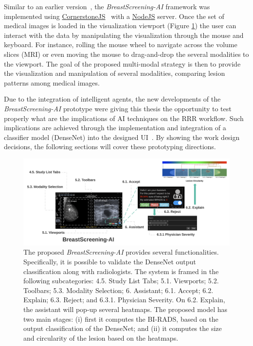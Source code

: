 Similar to an earlier version~\cite{https://doi.org/10.13140/rg.2.2.29816.70409}, the {\it BreastScreening-AI} framework was implemented using \href{https://cornerstonejs.org/}{CornerstoneJS}~\cite{urban2017lesiontracker} with a \href{https://nodejs.org/}{NodeJS} server.
Once the set of medical images is loaded in the visualization viewport (Figure \ref{fig:fig040}) the user can interact with the data by manipulating the visualization through the mouse and keyboard.
For instance, rolling the mouse wheel to navigate across the volume slices (\ac{MRI}) or even moving the mouse to drag-and-drop the several modalities to the viewport.
The goal of the proposed multi-modal strategy is then to provide the visualization and manipulation of several modalities, comparing lesion patterns among medical images.

Due to the integration of intelligent agents, the new developments of the {\it BreastScreening-AI} prototype were giving this thesis the opportunity to test properly what are the implications of \ac{AI} techniques on the \ac{RRR} workflow.
Such implications are achieved through the implementation and integration of a classifier model (DenseNet) into the designed \ac{UI}~\cite{maicas2018training}.
By showing the work design decisions, the following sections will cover these prototyping directions.

\begin{figure}[htbp]
\centering
\includegraphics[width=\textwidth]{images/fig040}
\caption{The proposed {\it BreastScreening-AI} provides several functionalities. Specifically, it is possible to validate the DenseNet output classification along with radiologists. The system is framed in the following subcategories: 4.5. Study List Tabs; 5.1. Viewports; 5.2. Toolbars; 5.3. Modality Selection; 6. Assistant; 6.1. Accept; 6.2. Explain; 6.3. Reject; and 6.3.1. Physician Severity. On 6.2. Explain, the assistant will pop-up several heatmaps. The proposed model has two main stages: (i)  first it computes the BI-RADS, based on the output classification of the DenseNet; and (ii) it computes the size and circularity of the lesion based on the heatmaps.}
\label{fig:fig040}
\end{figure}

